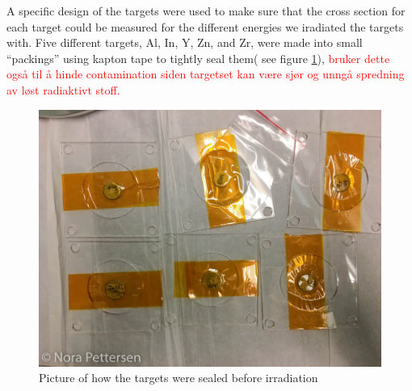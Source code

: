\documentclass[twoside,english]{uiofysmaster/uiofysmaster}
\begin{document}
A specific design of the targets were used to make sure that the cross section for each target could be measured for the different energies we iradiated the targets with. Five different targets, Al, In, Y, Zn, and Zr, were made into small “packings” using kapton tape to tightly seal them( see figure \ref{fig:target_design}), \textcolor{red}{ bruker dette også til å hinde contamination siden targetset kan være sjør og unngå spredning av løst radiaktivt stoff. }
\begin{figure} [h!]
   \centering
   \includegraphics[scale=.2]{packs-1.JPG}
   \caption{Picture of how the targets were sealed before irradiation}
   \label{fig:target_design}
\end{figure}
\end{document}
